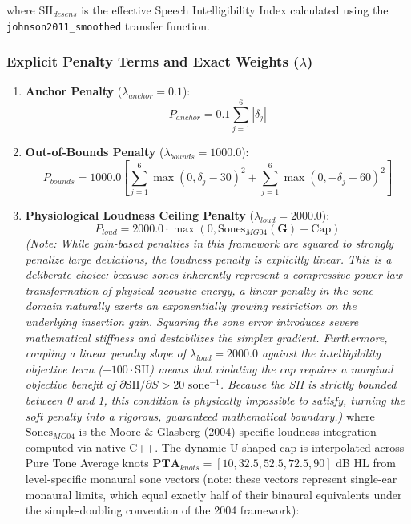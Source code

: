 \documentclass[
  12pt,
]{article}
\begin{document}
where \(\text{SII}_{desens}\) is the effective Speech Intelligibility
Index calculated using the \texttt{johnson2011\_smoothed} transfer
function.

\subsubsection{\texorpdfstring{Explicit Penalty Terms and Exact Weights
(\(\lambda\))}{Explicit Penalty Terms and Exact Weights (\textbackslash lambda)}}\label{explicit-penalty-terms-and-exact-weights-lambda}

\begin{enumerate}
\def\labelenumi{\arabic{enumi}.}
\item
  \textbf{Anchor Penalty} (\(\lambda_{anchor} = 0.1\)): \begin{equation}
  P_{anchor} = 0.1 \sum_{j=1}^6 |\delta_j|
  \end{equation}
\item
  \textbf{Out-of-Bounds Penalty} (\(\lambda_{bounds} = 1000.0\)):
  \begin{equation}
  P_{bounds} = 1000.0 \left[\sum_{j=1}^6 \max(0, \delta_j - 30)^2 + \sum_{j=1}^6 \max(0, -\delta_j - 60)^2\right]
  \end{equation}
\item
  \textbf{Physiological Loudness Ceiling Penalty}
  (\(\lambda_{loud} = 2000.0\)): \begin{equation}
  P_{loud} = 2000.0 \cdot \max(0, \text{Sones}_{MG04}(\mathbf{G}) - \text{Cap})
  \end{equation} \emph{(Note: While gain-based penalties in this
  framework are squared to strongly penalize large deviations, the
  loudness penalty is explicitly linear. This is a deliberate choice:
  because sones inherently represent a compressive power-law
  transformation of physical acoustic energy, a linear penalty in the
  sone domain naturally exerts an exponentially growing restriction on
  the underlying insertion gain. Squaring the sone error introduces
  severe mathematical stiffness and destabilizes the simplex gradient.
  Furthermore, coupling a linear penalty slope of
  \(\lambda_{loud} = 2000.0\) against the intelligibility objective term
  (\(-100 \cdot \text{SII}\)) means that violating the cap requires a
  marginal objective benefit of
  \(\partial \text{SII}/\partial S > 20 \text{ sone}^{-1}\). Because the
  SII is strictly bounded between 0 and 1, this condition is physically
  impossible to satisfy, turning the soft penalty into a rigorous,
  guaranteed mathematical boundary.)} where \(\text{Sones}_{MG04}\) is
  the Moore \& Glasberg (2004) specific-loudness integration computed
  via native C++. The dynamic U-shaped cap is interpolated across Pure
  Tone Average knots
  \(\mathbf{PTA}_{knots} = [10, 32.5, 52.5, 72.5, 90]\) dB HL from
  level-specific monaural sone vectors (note: these vectors represent
  single-ear monaural limits, which equal exactly half of their binaural
  equivalents under the simple-doubling convention of the 2004
  framework):


\end{enumerate}
\end{document}
